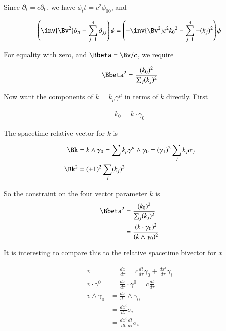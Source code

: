 Since $\partial_t = c\partial_0$, we have $\phi_tt = c^2 \phi_{00}$, and

\begin{align*}
\left( \inv{\Bv^2} \partial_{tt} - \sum_{j=1}^3 \partial_{jj}\right) \phi &= 
\left( -\inv{\Bv^2} c^2 {k_0}^2 - \sum_{j=1}^3 -(k_j)^2\right) \phi \\ 
\end{align*}

For equality with zero, and $\Bbeta = \Bv/c$, we require 

\begin{align*}
\Bbeta^2 = \frac{(k_0)^2}{\sum_j (k_j)^2}
\end{align*}

Now want the components of $k = k_\mu \gamma^\mu$ in terms of $k$ directly.  First

\begin{align*}
k_0 = k \cdot \gamma_0
\end{align*}

The spacetime relative vector for $k$ is

\begin{align*}
\Bk &= k \wedge \gamma_0 = \sum k_\mu \gamma^\mu \wedge \gamma_0 = (\gamma_1)^2 \sum_j k_j \sigma_j \\
\Bk^2 &= (\pm 1)^2 \sum_j (k_j)^2 
\end{align*}

So the constraint on the four vector parameter $k$ is 
\begin{align*}
\Bbeta^2
&= \frac{(k_0)^2}{\sum_j (k_j)^2} \\
&= \frac{(k \cdot \gamma_0)^2}{(k \wedge \gamma_0)^2} \\
\end{align*}

It is interesting to compare this to the relative spacetime bivector for $x$

\begin{align*}
v &= \frac{dx}{d\tau} = c \frac{dt}{d\tau} \gamma_0 + \frac{dx^i}{d\tau} \gamma_i \\
v \cdot \gamma^0 &= \frac{dx}{d\tau} \cdot \gamma^0 = c \frac{dt}{d\tau} \\
v \wedge \gamma_0 &= \frac{dx}{d\tau} \wedge \gamma_0 \\
&= \frac{dx^i}{d\tau} \sigma_i \\
&= \frac{dx^i}{dt} \frac{dt}{d\tau} \sigma_i \\
\end{align*}

